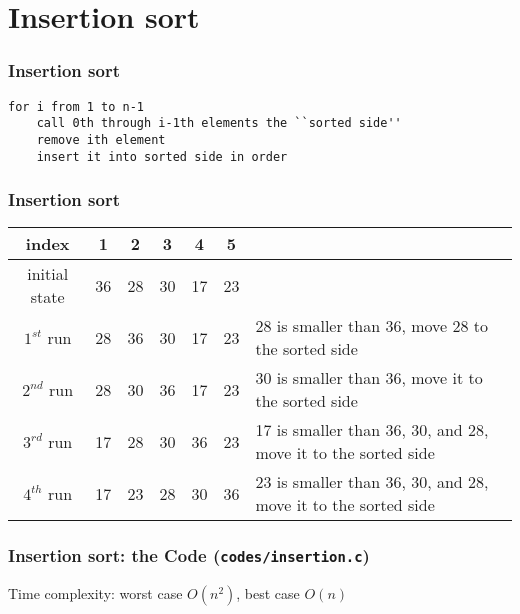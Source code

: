 \documentclass[newPxFont,sthlmFooter,nooffset]{beamer}
\begin{document}
\section{Insertion sort}

\begin{frame}[t, fragile]
  \frametitle{Insertion sort}
  \begin{lstlisting}
for i from 1 to n-1
    call 0th through i-1th elements the ``sorted side''
    remove ith element
    insert it into sorted side in order
  \end{lstlisting}  
\end{frame}

\begin{frame}[t, fragile]
  \frametitle{Insertion sort}
  \begin{table}
  	\centering
  	
\begin{tabular}{c || c | c | c | c | c | p{4.5cm}}
  index   & 1  & 2  & 3  & 4  & 5  & ~ \\ \hline
  initial state& 36 & 28 & 30 & 17 & 23 & \\ \hline
  $1^{st}$ run& \color{red}28 & \color{red}36 & 30 & 17 & 23 & {\footnotesize 28 is smaller than 36, move 28 to the sorted side} \pause \\  \hline
  $2^{nd}$ run& \color{red}28 & \color{red}30 & \color{red}36 & 17 & 23 & {\footnotesize 30 is smaller than 36, move it to the sorted side} \pause \\  \hline
  $3^{rd}$ run& \color{red}17 & \color{red}28 & \color{red}30 & \color{red}36 & 23 & {\footnotesize 17 is smaller than 36, 30, and 28, move it to the sorted side} \pause \\  \hline
  $4^{th}$ run& \color{red}17 & \color{red}23 & \color{red}28 & \color{red}30 & \color{red}36 & {\footnotesize 23 is smaller than 36, 30, and 28, move it to the sorted side} 
\end{tabular}

\end{table}
\end{frame}


\begin{frame}[t, fragile]
  \frametitle{Insertion sort: the Code (\texttt{codes/insertion.c})}
  

Time complexity: worst case $O(n^2)$, best case $O(n)$
\end{frame}
\end{document}
